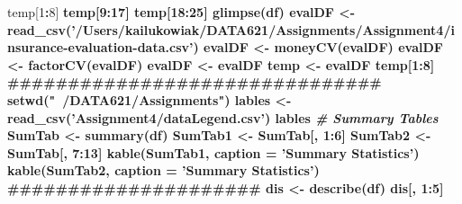 \documentclass[]{article}
\newenvironment{Shaded}{\begin{snugshade}}{\end{snugshade}}
\newcommand{\CommentTok}[1]{\textcolor[rgb]{0.56,0.35,0.01}{\textit{#1}}}
\newcommand{\DataTypeTok}[1]{\textcolor[rgb]{0.13,0.29,0.53}{#1}}
\newcommand{\DecValTok}[1]{\textcolor[rgb]{0.00,0.00,0.81}{#1}}
\newcommand{\KeywordTok}[1]{\textcolor[rgb]{0.13,0.29,0.53}{\textbf{#1}}}
\newcommand{\NormalTok}[1]{#1}
\newcommand{\OperatorTok}[1]{\textcolor[rgb]{0.81,0.36,0.00}{\textbf{#1}}}
\newcommand{\StringTok}[1]{\textcolor[rgb]{0.31,0.60,0.02}{#1}}
\begin{document}
\begin{Shaded}
\begin{Highlighting}[]
{{{{\NormalTok{temp[}\DecValTok{1}\OperatorTok{:}\DecValTok{8}\NormalTok{] }\OperatorTok{%>%}\StringTok{ }\KeywordTok{kable}\NormalTok{(}\DataTypeTok{caption =} \StringTok{'Sample of Values for the Training Set'}\NormalTok{)}
\NormalTok{temp[}\DecValTok{9}\OperatorTok{:}\DecValTok{17}\NormalTok{] }\OperatorTok{%>%}\StringTok{ }\KeywordTok{kable}\NormalTok{(}\DataTypeTok{caption =} \StringTok{'Sample of Values for the Training Set'}\NormalTok{)}
\NormalTok{temp[}\DecValTok{18}\OperatorTok{:}\DecValTok{25}\NormalTok{] }\OperatorTok{%>%}\StringTok{ }\KeywordTok{kable}\NormalTok{(}\DataTypeTok{caption =} \StringTok{'Sample of Values for the Training Set'}\NormalTok{)}
\KeywordTok{glimpse}\NormalTok{(df) }
\NormalTok{evalDF <-}\StringTok{ }\KeywordTok{read_csv}\NormalTok{(}\StringTok{'/Users/kailukowiak/DATA621/Assignments/Assignment4/insurance-evaluation-data.csv'}\NormalTok{)}
\NormalTok{evalDF <-}\StringTok{ }\KeywordTok{moneyCV}\NormalTok{(evalDF)}
\NormalTok{evalDF <-}\StringTok{ }\KeywordTok{factorCV}\NormalTok{(evalDF)}
\NormalTok{evalDF <-}\StringTok{ }\NormalTok{evalDF }\OperatorTok{%>%}\StringTok{ }\KeywordTok{select}\NormalTok{(}\OperatorTok{-}\NormalTok{INDEX, }\OperatorTok{-}\NormalTok{TARGET_AMT, }\OperatorTok{-}\NormalTok{TARGET_FLAG)}
\NormalTok{temp <-}\StringTok{ }\NormalTok{evalDF }\OperatorTok{%>%}\StringTok{ }\KeywordTok{sample_n}\NormalTok{(}\DecValTok{6}\NormalTok{)}
\NormalTok{temp[}\DecValTok{1}\OperatorTok{:}\DecValTok{8}\NormalTok{] }\OperatorTok{%>%}\StringTok{ }\KeywordTok{kable}\NormalTok{(}\DataTypeTok{caption =} \StringTok{'Sample of Values for the Test Set'}\NormalTok{)}
\NormalTok{###############################}
\KeywordTok{setwd}\NormalTok{(}\StringTok{"~/DATA621/Assignments"}\NormalTok{)}
\NormalTok{lables <-}\StringTok{ }\KeywordTok{read_csv}\NormalTok{(}\StringTok{'Assignment4/dataLegend.csv'}\NormalTok{)}
\NormalTok{lables }\OperatorTok{%>%}\StringTok{ }\KeywordTok{kable}\NormalTok{()}
\CommentTok{# Summary Tables}
\NormalTok{SumTab <-}\StringTok{ }\KeywordTok{summary}\NormalTok{(df)}
\NormalTok{SumTab1 <-}\StringTok{ }\NormalTok{SumTab[, }\DecValTok{1}\OperatorTok{:}\DecValTok{6}\NormalTok{]}
\NormalTok{SumTab2 <-}\StringTok{ }\NormalTok{SumTab[, }\DecValTok{7}\OperatorTok{:}\DecValTok{13}\NormalTok{]}
\KeywordTok{kable}\NormalTok{(SumTab1, }\DataTypeTok{caption =} \StringTok{'Summary Statistics'}\NormalTok{)}
\KeywordTok{kable}\NormalTok{(SumTab2, }\DataTypeTok{caption =} \StringTok{'Summary Statistics'}\NormalTok{)}
\NormalTok{#####################}
\NormalTok{dis <-}\StringTok{ }\KeywordTok{describe}\NormalTok{(df)}
\NormalTok{dis[, }\DecValTok{1}\OperatorTok{:}\DecValTok{5}\NormalTok{] }\OperatorTok{%>%}\StringTok{ }\KeywordTok{kable}\NormalTok{(}\DataTypeTok{caption =} \StringTok{'Descriptive Statistics'}\NormalTok{)}
}}}}}}}}}}}}
\end{Highlighting}
\end{Shaded}
\end{document}
